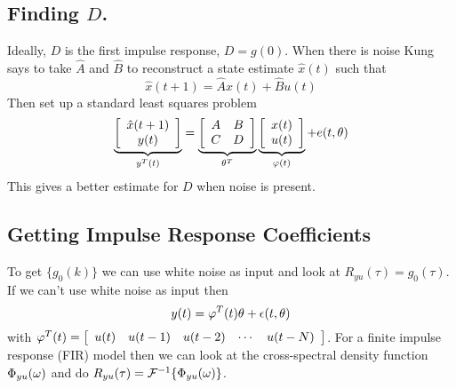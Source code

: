 \subsection{Finding $D$.}
Ideally, $D$ is the first impulse response, $D=g(0)$. When there is noise Kung says to take $\hat{A}$ and $\hat{B}$ to reconstruct a state estimate $\hat{x}(t)$ such that
$$\hat{x}(t+1) = \hat{A}x(t)+\hat{B}u(t)$$
Then set up a standard least squares problem
\begin{align*}
\underbrace{\left[\begin{array}{c} \hat{x}(t+1) \\ y(t) \end{array}\right]}_{y^T(t)}
= \underbrace{\left[\begin{array}{c c} A & B \\ C & D \end{array}\right]}_{\theta^T}
\underbrace{\left[\begin{array}{c} x(t) \\ u(t) \end{array}\right]}_{\varphi(t)} + e(t,\theta)
\end{align*}
This gives a better estimate for $D$ when noise is present.

\subsection{Getting Impulse Response Coefficients}
To get $\{g_0(k)\}$ we can use white noise as input and look at $R_{yu}(\tau)=g_0(\tau)$. If we can't use white noise as input then
$$y(t) = \varphi^T(t)\theta+\epsilon(t,\theta)$$
with $\varphi^T(t) = \left[\begin{array}{c c c c c} u(t) & u(t-1) & u(t-2) & \cdots & u(t-N) \end{array}\right]$. For a finite impulse response (FIR) model then we can look at the cross-spectral density function $\Phi_{yu}(\omega)$ and do $R_{yu}(\tau) = \mathcal{F}^{-1}\{\Phi_{yu}(\omega)\}$.


% 

